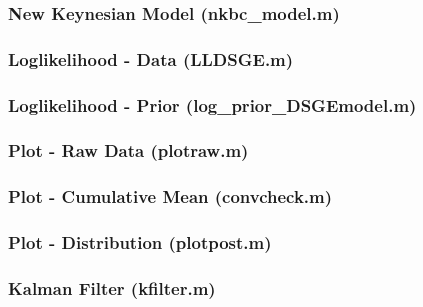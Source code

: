 \documentclass[12pt]{article}
\theoremstyle{definition}
\begin{document}
\subsubsection*{New Keynesian Model (nkbc\_model.m)}


\subsubsection*{Loglikelihood - Data (LLDSGE.m)}


\subsubsection*{Loglikelihood - Prior (log\_prior\_DSGEmodel.m)}


\subsubsection*{Plot - Raw Data (plotraw.m)}


\subsubsection*{Plot - Cumulative Mean (convcheck.m)}


\subsubsection*{Plot - Distribution (plotpost.m)}


\subsubsection*{Kalman Filter (kfilter.m)}

\end{document}
